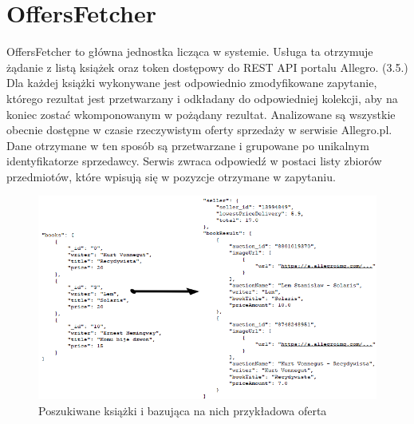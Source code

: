 \section{OffersFetcher}
OffersFetcher to główna jednostka licząca w systemie. Usługa ta otrzymuje żądanie z listą książek oraz token dostępowy do REST API portalu Allegro. (3.5.)
Dla każdej książki wykonywane jest odpowiednio zmodyfikowane zapytanie, którego rezultat jest przetwarzany i odkładany do odpowiedniej kolekcji, aby na koniec zostać wkomponowanym w pożądany rezultat. Analizowane są wszystkie obecnie dostępne w czasie rzeczywistym oferty sprzedaży w serwisie Allegro.pl. \\Dane otrzymane w ten sposób są przetwarzane i grupowane po unikalnym identyfikatorze sprzedawcy. Serwis zwraca odpowiedź w postaci listy zbiorów przedmiotów, które wpisują się w pozyzcje otrzymane w zapytaniu. 
\begin{figure}[H]
	\centering
	\includegraphics[width=\linewidth]{booksToOffers.png}
	\caption{Poszukiwane książki i bazująca na nich przykładowa oferta}
\end{figure}
